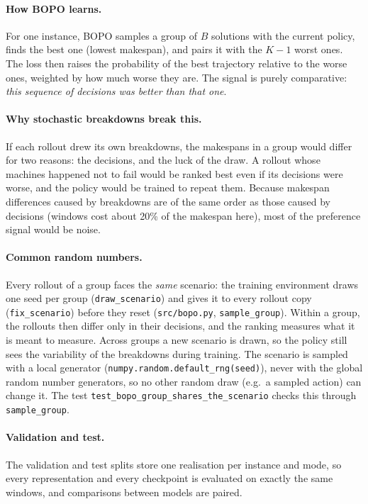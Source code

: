 \documentclass[11pt,a4paper]{article}
\newcommand{\code}[1]{\texttt{#1}}
\begin{document}
\paragraph{How BOPO learns.} For one instance, BOPO samples a group of $B$ solutions with the
current policy, finds the best one (lowest makespan), and pairs it with the $K-1$ worst ones.
The loss then raises the probability of the best trajectory relative to the worse ones,
weighted by how much worse they are. The signal is purely comparative: \emph{this sequence of
decisions was better than that one}.

\paragraph{Why stochastic breakdowns break this.} If each rollout drew its own breakdowns, the
makespans in a group would differ for two reasons: the decisions, and the luck of the draw. A
rollout whose machines happened not to fail would be ranked best even if its decisions were
worse, and the policy would be trained to repeat them. Because makespan differences caused by
breakdowns are of the same order as those caused by decisions (windows cost about 20\% of the
makespan here), most of the preference signal would be noise.

\paragraph{Common random numbers.} Every rollout of a group faces the \emph{same} scenario: the
training environment draws one seed per group (\code{draw\_scenario}) and gives it to every
rollout copy (\code{fix\_scenario}) before they reset (\code{src/bopo.py}, \code{sample\_group}).
Within a group, the rollouts then differ only in their decisions, and the ranking measures what
it is meant to measure. Across groups a new scenario is drawn, so the policy still sees the
variability of the breakdowns during training. The scenario is sampled with a local
generator (\code{numpy.random.default\_rng(seed)}), never with the global random number
generators, so no other random draw (e.g.\ a sampled action) can change it. The test
\code{test\_bopo\_group\_shares\_the\_scenario} checks this through \code{sample\_group}.

\paragraph{Validation and test.} The validation and test splits store one realisation per
instance and mode, so every representation and every checkpoint is evaluated on exactly the
same windows, and comparisons between models are paired.
\end{document}
